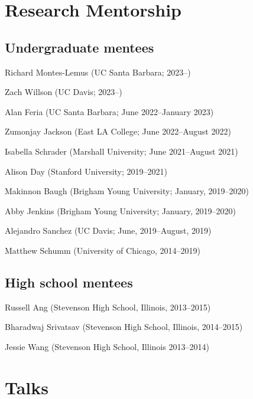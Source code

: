 \documentclass[letterpaper]{article}
\renewenvironment{itemize}{
  \begin{list}{}{
    \setlength{\leftmargin}{1.5em}
  }
}{
  \end{list}
}
\begin{document}
\section*{Research Mentorship}
\subsection*{Undergraduate mentees}
\begin{itemize}
\item Richard Montes-Lemus (UC Santa Barbara; 2023--)
\item Zach Willson (UC Davis; 2023--)
\item Alan Feria (UC Santa Barbara; June 2022--January 2023)
\item Zumonjay Jackson (East LA College; June 2022--August 2022)
\item Isabella Schrader (Marshall University; June 2021--August 2021)
\item Alison Day (Stanford University; 2019--2021)
\item Makinnon Baugh (Brigham Young University; January, 2019--2020)
\item Abby Jenkins (Brigham Young University; January, 2019--2020)
\item Alejandro Sanchez (UC Davis; June, 2019--August, 2019)
\item Matthew Schumm (University of Chicago, 2014--2019)
\end{itemize}
\subsection*{High school mentees}
\begin{itemize}
\item Russell Ang (Stevenson High School, Illinois, 2013--2015)
\item Bharadwaj Srivatsav (Stevenson High School, Illinois, 2014--2015)
\item Jessie Wang (Stevenson High School, Illinois 2013--2014)
\end{itemize}

\section*{Talks}
\end{document}
